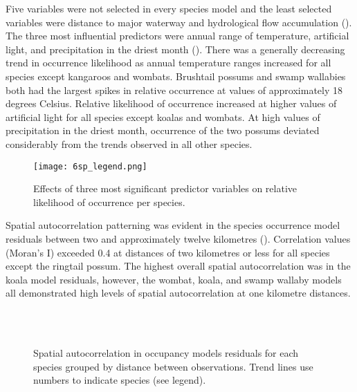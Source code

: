 Five variables were not selected in every species model and the least selected variables were distance to major waterway and hydrological flow accumulation (). The three most influential predictors were annual range of temperature, artificial light, and precipitation in the driest month (). There was a generally decreasing trend in occurrence likelihood as annual temperature ranges increased for all species except kangaroos and wombats. Brushtail possums and swamp wallabies both had the largest spikes in relative occurrence at values of approximately 18 degrees Celsius. Relative likelihood of occurrence increased at higher values of artificial light for all species except koalas and wombats. At high values of precipitation in the driest month, occurrence of the two possums deviated considerably from the trends observed in all other species. 

\begin{figure*}[!t]
  \centering
  \texttt{[image: 6sp\_legend.png]}\\
  \caption[Most significant predictor variables on relative likelihood of occurrence for six mammal species]{Effects of three most significant predictor variables on relative likelihood of occurrence per species.}
  \label{6sp_term_occ}
\end{figure*}

Spatial autocorrelation patterning was evident in the species occurrence model residuals between two and approximately twelve kilometres (). Correlation values (Moran's I) exceeded 0.4 at distances of two kilometres or less for all species except the ringtail possum. The highest overall spatial autocorrelation was in the koala model residuals, however, the wombat, koala, and swamp wallaby models all demonstrated high levels of spatial autocorrelation at one kilometre distances.

\begin{figure*}[!t]
  \centering
  \\
  \\
  \caption[Spatial autocorrelation in occupancy models residuals for six mammal species]{Spatial autocorrelation in occupancy models residuals for each species grouped by distance between observations. Trend lines use numbers to indicate species (see legend).}
  \label{6sp_sac}
\end{figure*}

